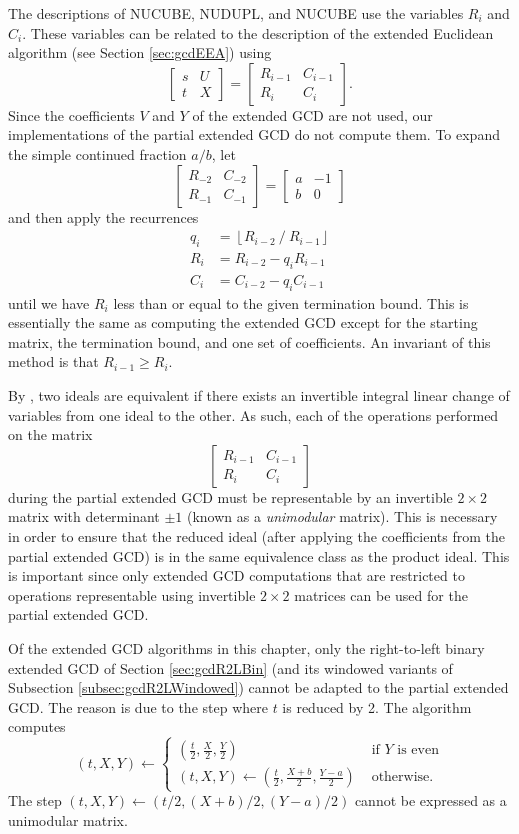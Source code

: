 \documentclass{ucalgthes1}
\theoremstyle{definition}
\newcommand{\matrixtt}[4]{\left[ \begin{array}{rr} #1 & #2 \\ #3 & #4 \end{array} \right]}
\newcommand{\floor}[1]{\left\lfloor #1 \right\rfloor}
\begin{document}
The descriptions of NUCUBE, NUDUPL, and NUCUBE use the variables $R_i$ and $C_i$.  These variables can be related to the description of the extended Euclidean algorithm (see Section \ref{sec:gcdEEA}) using
\[
	\matrixtt{s}{U}{t}{X} = \matrixtt{R_{i-1}}{C_{i-1}}{R_i}{C_i}.
\]
Since the coefficients $V$ and $Y$ of the extended GCD are not used, our implementations of the partial extended GCD do not compute them.
To expand the simple continued fraction $a/b$, let
\[
\matrixtt{R_{-2}}{C_{-2}}{R_{-1}}{C_{-1}} = \matrixtt{a}{-1}{b}{0}
\]
and then apply the recurrences
\begin{align*}
	q_i &= \floor{R_{i-2} ~/~ R_{i-1}} \\
	R_i &= R_{i-2} - q_i R_{i-1} \\
	C_i &= C_{i-2} - q_i C_{i-1}
\end{align*}
until we have $R_i$ less than or equal to the given termination bound.  This is essentially the same as computing the extended GCD except for the starting matrix, the termination bound, and one set of coefficients.  An invariant of this method is that $R_{i-1} \ge R_i$.

By \cite[\S 5.6.1]{Crandall2001}, two ideals are equivalent if there exists an invertible integral linear change of variables from one ideal to the other.  As such, each of the operations performed on the matrix
\[
\matrixtt{R_{i-1}}{C_{i-1}}{R_i}{C_i}
\]
during the partial extended GCD must be representable by an invertible $2 \times 2$ matrix with determinant $\pm 1$ (known as a \emph{unimodular} matrix).  This is necessary in order to ensure that the reduced ideal (after applying the coefficients from the partial extended GCD) is in the same equivalence class as the product ideal.  This is important since only extended GCD computations that are restricted to operations representable using invertible $2 \times 2$ matrices can be used for the partial extended GCD.

Of the extended GCD algorithms in this chapter, only the right-to-left binary extended GCD of Section \ref{sec:gcdR2LBin} (and its windowed variants of Subsection \ref{subsec:gcdR2LWindowed}) cannot be adapted to the partial extended GCD.  The reason is due to the step where $t$ is reduced by 2.  The algorithm computes
\[
	(t, X, Y) \gets \begin{cases}
		\left( \frac{t}{2}, \frac{X}{2}, \frac{Y}{2} \right) &
			\textrm{ if $Y$ is even} \\
		(t, X, Y) \gets \left( \frac{t}{2}, \frac{X+b}{2}, \frac{Y-a}{2} \right) & 
			\textrm{ otherwise.}
	\end{cases}
\]
The step $(t, X, Y) \gets (t/2, (X+b)/2, (Y-a)/2)$ cannot be expressed as a unimodular matrix.
\end{document}
